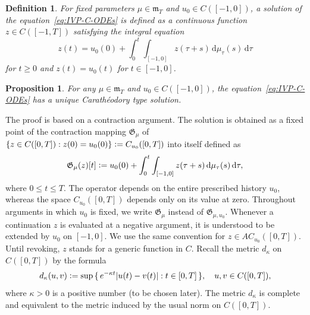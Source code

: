 \documentclass[reqno]{amsart}
\theoremstyle{plain}
\newtheorem{proposition}{Proposition}[section]
\newtheorem{definition}{Definition}[section]
\numberwithin{equation}{section}
\numberwithin{definition}{section}
\newcommand{\dd}{\ensuremath{\mathrm{d}}}
\begin{document}
\begin{definition}
   For fixed parameters $\mu\in \mathfrak{m}_T$ and $u_0 \in C([-1, 0])$, a solution of the equation~\eqref{eq:IVP-C-ODEs} is defined as a continuous function $z\in C([-1,T])$ satisfying the integral equation 
   \begin{equation}\label{eq:int-variant}
       z(t) = u_0(0) + \int_0^t \displaystyle \int_{[-1,0]} z(\tau +s) \, \dd\mu_{\tau} (s) \,\dd \tau  
   \end{equation}
   for $t\ge 0$ and $z(t)=u_0(t)$ for $t\in[-1,0]$. 
\end{definition}
\begin{proposition} \label{prop:unigue-sol-in-C}
   For any $\mu\in \mathfrak{m}_T$ and $u_0 \in C([-1, 0])$, the equation~\eqref{eq:IVP-C-ODEs} has a unique Carath\'{e}odory type solution. 
\end{proposition}
 The proof is based on a contraction argument.  The solution is obtained as a fixed point of the contraction mapping $\mathfrak{G}_{\mu}$ of $\{z\in C([0,T]) : z(0)=u_0(0)\}\vcentcolon ={C_{u_0}([0,T])}$ into itself defined as
\begin{equation}
\label{eq:Gothic-G-ODEs}
  \begin{aligned}
  \mathfrak{G}_{\mu}(z)[t] \vcentcolon= {} u_0(0)+\int_0^t \int_{[-1,0]} z(\tau+s)  \, \dd \mu_{\tau}(s) \,\dd\tau,
  \end{aligned}
\end{equation}
where $0 \le t \le T$.
The operator depends on the entire prescribed history $u_0$,
whereas the space $C_{u_0}([0,T])$ depends only on its value
at zero. Throughout arguments in which $u_0$ is fixed,
we write $\mathfrak G_{\mu}$ instead of
$\mathfrak G_{\mu,u_0}$.
Whenever a continuation $z$ is evaluated at a negative
argument, it is understood to be extended by $u_0$ on
$[-1,0]$. We use the same convention for
$z\in AC_{u_0}([0,T])$.
Until revoking, $z$ stands for a generic function in $C$. Recall the metric $d_{\kappa}$ on $C([0, T])$ by the formula
\begin{equation*}
    d_{\kappa}(u, v) \vcentcolon = \sup{\{\, e^{-{\kappa}t} |u(t) - v(t)| : t \in [0, T] \,\}}, \quad u, v \in C([0,T]),
\end{equation*}
where $\kappa > 0$ is a positive number (to be chosen later).  The metric $d_{\kappa}$ is complete and equivalent to the metric induced by the usual norm on $C([0,T])$.
\end{document}
